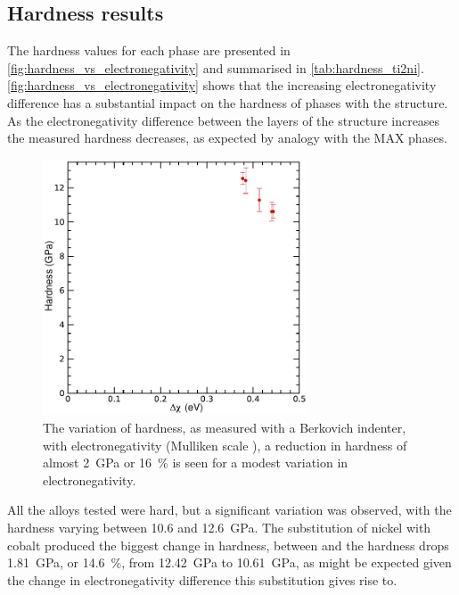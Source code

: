 \subsection{Hardness results}



The hardness values for each phase are presented in \autoref{fig:hardness_vs_electronegativity} and summarised in \autoref{tab:hardness_ti2ni}. \autoref{fig:hardness_vs_electronegativity} shows that the increasing electronegativity difference has a substantial impact on the hardness of phases with the  structure. As the electronegativity difference between the layers of the  structure increases the measured hardness decreases, as expected by analogy with the MAX phases. 


\begin{figure}[!htb]
\centering
\captionsetup{width=0.7\textwidth}
\includegraphics[width=0.7\textwidth]{Ti2Ni_H_vs_dX}
\caption[The variation of hardness with electronegativity difference in .]{The variation of hardness, as measured with a Berkovich indenter, with electronegativity (Mulliken scale \cite{Mulliken1934}), a reduction in hardness of almost \SI{2}{\giga\pascal} or \SI{16}{\percent} is seen for a modest variation in electronegativity.\label{fig:hardness_vs_electronegativity}}
\end{figure}



All the alloys tested were hard, but a significant variation was observed, with the hardness varying between \num{10.6} and \SI{12.6}{\giga\pascal}. The substitution of nickel with cobalt produced the biggest change in hardness, between  and  the hardness drops \SI{1.81}{\giga\pascal}, or \SI{14.6}{\percent}, from \SI{12.42}{\giga\pascal} to \SI{10.61}{\giga\pascal}, as might be expected given the change in electronegativity difference this substitution gives rise to.


